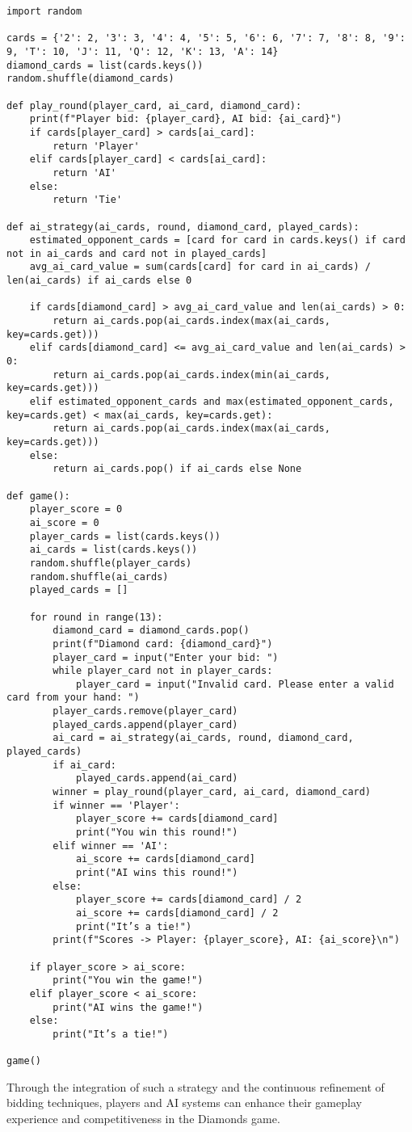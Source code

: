 \documentclass[letterpaper,12pt]{article}
\begin{document}
\begin{verbatim}
import random

cards = {'2': 2, '3': 3, '4': 4, '5': 5, '6': 6, '7': 7, '8': 8, '9': 9, 'T': 10, 'J': 11, 'Q': 12, 'K': 13, 'A': 14}
diamond_cards = list(cards.keys())
random.shuffle(diamond_cards)

def play_round(player_card, ai_card, diamond_card):
    print(f"Player bid: {player_card}, AI bid: {ai_card}")
    if cards[player_card] > cards[ai_card]:
        return 'Player'
    elif cards[player_card] < cards[ai_card]:
        return 'AI'
    else:
        return 'Tie'

def ai_strategy(ai_cards, round, diamond_card, played_cards):
    estimated_opponent_cards = [card for card in cards.keys() if card not in ai_cards and card not in played_cards]
    avg_ai_card_value = sum(cards[card] for card in ai_cards) / len(ai_cards) if ai_cards else 0

    if cards[diamond_card] > avg_ai_card_value and len(ai_cards) > 0:
        return ai_cards.pop(ai_cards.index(max(ai_cards, key=cards.get)))
    elif cards[diamond_card] <= avg_ai_card_value and len(ai_cards) > 0:
        return ai_cards.pop(ai_cards.index(min(ai_cards, key=cards.get)))
    elif estimated_opponent_cards and max(estimated_opponent_cards, key=cards.get) < max(ai_cards, key=cards.get):
        return ai_cards.pop(ai_cards.index(max(ai_cards, key=cards.get)))
    else:
        return ai_cards.pop() if ai_cards else None

def game():
    player_score = 0
    ai_score = 0
    player_cards = list(cards.keys())
    ai_cards = list(cards.keys())
    random.shuffle(player_cards)
    random.shuffle(ai_cards)
    played_cards = []

    for round in range(13):
        diamond_card = diamond_cards.pop()
        print(f"Diamond card: {diamond_card}")
        player_card = input("Enter your bid: ")
        while player_card not in player_cards:
            player_card = input("Invalid card. Please enter a valid card from your hand: ")
        player_cards.remove(player_card)
        played_cards.append(player_card)
        ai_card = ai_strategy(ai_cards, round, diamond_card, played_cards)
        if ai_card:
            played_cards.append(ai_card)
        winner = play_round(player_card, ai_card, diamond_card)
        if winner == 'Player':
            player_score += cards[diamond_card]
            print("You win this round!")
        elif winner == 'AI':
            ai_score += cards[diamond_card]
            print("AI wins this round!")
        else:
            player_score += cards[diamond_card] / 2
            ai_score += cards[diamond_card] / 2
            print("It’s a tie!")
        print(f"Scores -> Player: {player_score}, AI: {ai_score}\n")

    if player_score > ai_score:
        print("You win the game!")
    elif player_score < ai_score:
        print("AI wins the game!")
    else:
        print("It’s a tie!")

game()
\end{verbatim}

Through the integration of such a strategy and the continuous refinement of bidding techniques, players and AI systems can enhance their gameplay experience and competitiveness in the Diamonds game.
\end{document}
